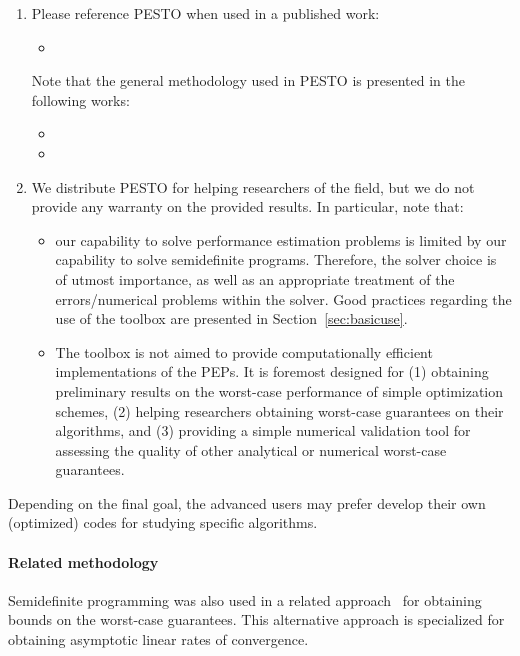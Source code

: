 \documentclass[11pt,a4paper]{article}
\newcommand{\pesto}{{PESTO }}
\begin{document}
\begin{enumerate}
\item Please reference \pesto when used in a published work:
\begin{itemize}
	\item {}
\end{itemize}
Note that the general methodology used in \pesto is presented in the following works:
\begin{itemize}
\item {}
\item {}
\end{itemize}
\item We distribute \pesto  for helping researchers of the field, but we do not provide any warranty on the provided results. In particular, note that:
\begin{itemize}
\item our capability to solve performance estimation problems is limited by our capability to solve semidefinite programs. Therefore, the solver choice is of utmost importance, as well as an appropriate treatment of the errors/numerical problems within the solver. Good practices regarding the use of the toolbox are presented in Section~\ref{sec:basicuse}.
\item The toolbox is not aimed to provide computationally efficient implementations of the PEPs. It is foremost designed for (1) obtaining preliminary results on the worst-case performance of simple optimization schemes, (2) helping researchers obtaining worst-case guarantees on their algorithms, and (3) providing a simple numerical validation tool for assessing the quality of other analytical or numerical worst-case guarantees. 
\end{itemize}
\end{enumerate}

Depending on the final goal, the advanced users may prefer develop their own (optimized) codes for studying specific algorithms.
\paragraph{Related methodology} Semidefinite programming was also used in a related approach~\cite{lessard2014analysis} for obtaining bounds on the worst-case guarantees. This alternative approach is specialized for obtaining asymptotic linear rates of convergence.

\end{document}
